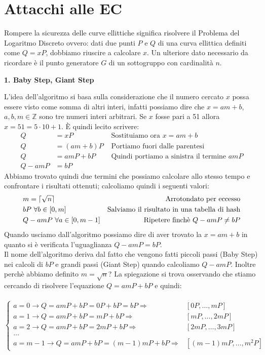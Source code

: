 \documentclass[a4paper,12pt]{tesiinfo}
\DeclarePairedDelimiter\ceil{\lceil}{\rceil}
\begin{document}
\chapter{Attacchi alle EC}
Rompere la sicurezza delle curve ellittiche significa risolvere il Problema del Logaritmo Discreto ovvero: dati due punti $P$ e $Q$ di una curva ellittica definiti come $Q = xP$, dobbiamo riuscire a calcolare $x$. Un ulteriore dato necessario da ricordare \`e il punto generatore $G$ di un sottogruppo con cardinalit\`a $n$.
\\
\begin{center}
    \textbf{1. Baby Step, Giant Step}
\end{center}
L'idea dell'algoritmo si basa sulla considerazione che il numero cercato $x$ possa essere visto come somma di altri interi, infatti possiamo dire che $x = am+b$, $a, b, m \in \mathbb{Z}$ sono tre numeri interi arbitrari. Se $x$ fosse pari a 51 allora $x = 51 = 5 \cdot 10 + 1$. \`E quindi lecito scrivere:
\begin{align*}
    Q &= xP &\text{ Sostituiamo ora }x = am+b\\
    Q &= (am+b)P &\text{ Portiamo fuori dalle parentesi }\\
    Q &= amP+bP &\text{ Quindi portiamo a sinistra il termine }amP\\
    Q -amP &= bP
\end{align*}
Abbiamo trovato quindi due termini che possiamo calcolare allo stesso tempo e confrontare i risultati ottenuti; calcoliamo quindi i seguenti valori:
\begin{align*}
    &m = \ceil{\sqrt{n}} &\text{Arrotondato per eccesso}\\
    &bP \text{ }\forall b \in [0, m] &\text{Salviamo il risultato in una tabella di hash}\\
    &Q -amP \text{ }\forall a \in [0, m-1] &\text{Ripetere finch\`e } Q -amP \ne bP
\end{align*}
Quando usciamo dall'algoritmo possiamo dire di aver trovato la $x = am+b$ in quanto si \`e verificata l'uguaglianza $Q -amP = bP$.
\\
Il nome dell'algoritmo deriva dal fatto che vengono fatti piccoli passi (Baby Step) nei calcoli di $bP$ e grandi passi (Giant Step) quando calcoliamo $Q-amP$. Inoltre perch\`e abbiamo definito $m = \sqrt{n}$? La spiegazione si trova osservando che stiamo cercando di risolvere l'equazione $Q = amP+bP$ e quindi:\\
\\
$\begin{cases}
    a = 0 \to Q=amP+bP=0P+bP=bP \Rightarrow & [0P, \ldots, mP]\\
    a = 1 \to Q=amP+bP=mP+bP \Rightarrow & [mP, \ldots, 2mP]\\
    a = 2 \to Q=amP+bP=2mP+bP \Rightarrow & [2mP, \ldots, 3mP]\\
    \ldots\\
    a = m-1 \to Q=amP+bP=(m-1)mP+bP \Rightarrow & [(m-1)mP, \ldots, m^2P]
\end{cases}$
\end{document}
